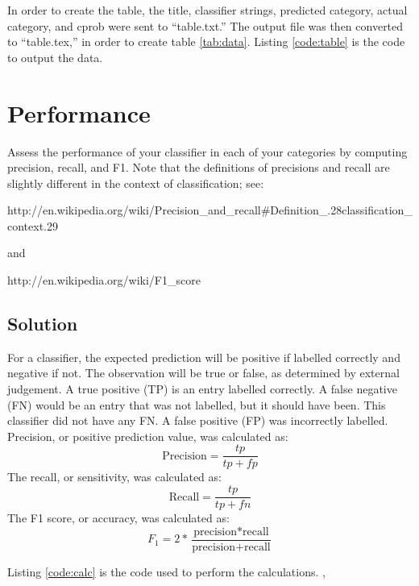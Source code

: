\documentclass[paper=a4, fontsize=11pt]{scrartcl} %
\numberwithin{equation}{section} %
\numberwithin{figure}{section} %
\numberwithin{table}{section} %
\begin{document}
In order to create the table, the title, classifier strings, predicted category, actual category, and cprob were sent to ``table.txt.''
The output file was then converted to ``table.tex,'' in order to create table \ref{tab:data}.
Listing \ref{code:table} is the code to output the data.\cite{bib:collective}







\section{Performance}
Assess the performance of your classifier in each of your categories
by computing precision, recall, and F1.
Note that the definitions
of precisions and recall are slightly different in the context of
classification; see:

http://en.wikipedia.org/wiki/Precision\_and\_recall\#Definition\_.28classification\_context.29

and

http://en.wikipedia.org/wiki/F1\_score

\subsection{Solution}
For a classifier, the expected prediction will be positive if labelled correctly and negative if not.
The observation will be true or false, as determined by external judgement.
A true positive (TP) is an entry labelled correctly.
A false negative (FN) would be an entry that was not labelled, but it should have been.  
This classifier did not have any FN.
A false positive (FP) was incorrectly labelled.\cite{bib:class}
Precision, or positive prediction value, was calculated as:
\[
\textrm{Precision}  = \frac{tp}{ tp + fp}
\]
The recall, or sensitivity, was calculated as:
\[
\textrm{Recall}  = \frac{tp}{tp + fn}
\]
The F1 score, or accuracy, was calculated as:
\[
F_1  = 2 * \frac{\textrm{precision}*\textrm{recall}}{\textrm{precision} + \textrm{recall}}
\]

Listing \ref{code:calc} is the code used to perform the calculations. \cite{bib:class},\cite{bib:f1}
\end{document}

